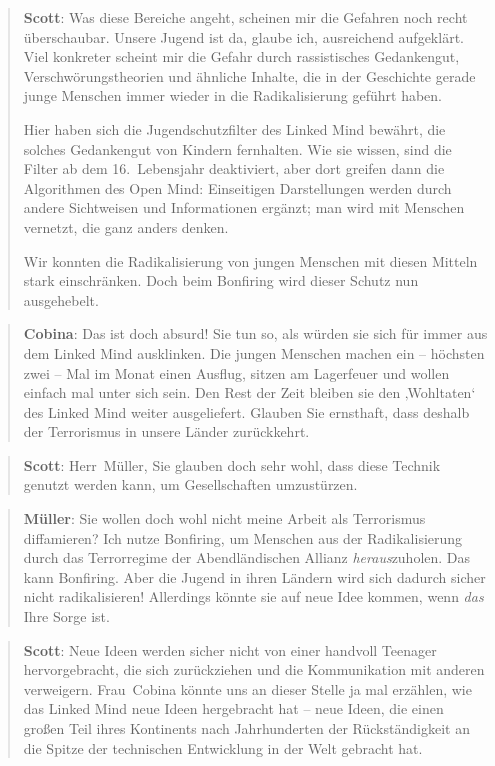 \documentclass{scrartcl}
\newenvironment{antworta}{
  \begin{quotation}
  }{
  \end{quotation}
}
\newenvironment{antwortb}{
  \begin{quotation}
  }{
  \end{quotation}
}
\newcommand{\name}[1]{\textbf{#1}}
\begin{document}
\begin{antworta}
\name{Scott}: Was diese Bereiche angeht, scheinen mir die
    Gefahren noch recht überschaubar. Unsere Jugend ist da,
    glaube ich, ausreichend aufgeklärt. Viel konkreter
    scheint mir die Gefahr durch rassistisches Gedankengut,
    Verschwörungstheorien und ähnliche Inhalte, die in der
    Geschichte gerade junge Menschen immer wieder in die
    Radikalisierung geführt haben.

Hier haben sich die Jugendschutzfilter des Linked Mind
  bewährt, die solches Gedankengut von Kindern
  fernhalten. Wie sie wissen, sind die Filter ab dem
  16.~Lebensjahr deaktiviert, aber dort greifen dann die
  Algorithmen des Open Mind: Einseitigen Darstellungen
  werden durch andere Sichtweisen und Informationen ergänzt;
  man wird mit Menschen vernetzt, die ganz anders denken.

Wir konnten die Radikalisierung von jungen Menschen mit
  diesen Mitteln stark einschränken. Doch beim Bonfiring
  wird dieser Schutz nun ausgehebelt.
\end{antworta}


\begin{antwortb}
\name{Cobina}: Das ist doch absurd! Sie tun so, als würden sie sich
für immer aus dem Linked Mind ausklinken. Die jungen
Menschen machen ein – höchsten zwei – Mal im Monat einen
Ausflug, sitzen am Lagerfeuer und wollen einfach mal unter
sich sein. Den Rest der Zeit bleiben sie den ‚Wohltaten‘ des
Linked Mind weiter ausgeliefert. Glauben Sie ernsthaft, dass
deshalb der Terrorismus in unsere Länder zurückkehrt.
\end{antwortb}


\begin{antworta}
\name{Scott}: Herr~Müller, Sie glauben doch sehr wohl, dass diese
Technik genutzt werden kann, um Gesellschaften umzustürzen.
\end{antworta}


\begin{antwortb}
\name{Müller}: Sie wollen doch wohl nicht meine Arbeit als
Terrorismus diffamieren? Ich nutze Bonfiring, um Menschen
aus der Radikalisierung durch das Terrorregime der
Abendländischen Allianz \emph{heraus}zuholen. Das kann
Bonfiring. Aber die Jugend in ihren Ländern wird sich
dadurch sicher nicht radikalisieren! Allerdings könnte sie
auf neue Idee kommen, wenn \emph{das} Ihre Sorge ist.
\end{antwortb}


\begin{antworta}
\name{Scott}: Neue Ideen werden sicher nicht von einer handvoll
Teenager hervorgebracht, die sich zurückziehen und die
Kommunikation mit anderen verweigern. Frau~Cobina könnte uns
an dieser Stelle ja mal erzählen, wie das Linked Mind neue
Ideen hergebracht hat – neue Ideen, die einen großen Teil
ihres Kontinents nach Jahrhunderten der Rückständigkeit an
die Spitze der technischen Entwicklung in der Welt gebracht
hat.
\end{antworta}
\end{document}

